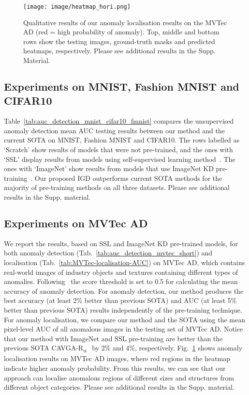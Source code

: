 \documentclass[letterpaper]{article} \usepackage{aaai22}  \usepackage{times}  \usepackage{helvet}  \usepackage{courier}  \usepackage[hyphens]{url}  \usepackage{graphicx} \urlstyle{rm} \def\UrlFont{\rm}  \usepackage{natbib}  \usepackage{caption} \DeclareCaptionStyle{ruled}{labelfont=normalfont,labelsep=colon,strut=off} \frenchspacing  \setlength{\pdfpagewidth}{8.5in}  \setlength{\pdfpageheight}{11in}  \usepackage{algorithm}
\begin{document}
\begin{figure}[t]
    \centering
    \texttt{[image: image/heatmap\_hori.png]}
    \caption{Qualitative results of our anomaly localisation results on the MVTec AD (red = high probability of anomaly). Top, middle and bottom rows show the testing images, ground-truth masks and predicted heatmaps, respectively. Please see additional results in the Supp. Material.} 
    \label{fig:mvtec_seg}
\end{figure}

\subsection{Experiments on MNIST, Fashion MNIST and CIFAR10}
Table~\ref{tab:auc_detection_mnist_cifar10_fmnist} compares the unsupervised anomaly detection mean AUC testing results between our method and the current SOTA on MNIST, Fashion MNIST and CIFAR10.
The rows labelled as `Scratch' show results of models that were not pre-trained, and the ones with `SSL' display results from models using self-supervised learning method~\cite{golan2018deep,bergman2020classification}. The ones with `ImageNet' show results from models that use ImageNet KD pre-training~\cite{venkataramanan2019attention,bergmann2020uninformed}. 
Our proposed IGD 
outperforms current SOTA methods for the majority of pre-training methods on all three datasets.
Please see additional results in the Supp. material.









\subsection{Experiments on MVTec AD}

We report the results, based on SSL and ImageNet KD pre-trained models, for both anomaly detection (Tab.~\ref{tab:auc_detection_mvtec_short}) and localisation (Tab.~\ref{tab:MVTec-localisation-AUC}) on MVTec AD, which contains real-world images of industry objects and textures containing different types of anomalies. Following~\cite{venkataramanan2019attention} the score threshold is set to 0.5 for calculating the mean accuracy of anomaly detection.
For anomaly detection, our method produces the best accuracy (at least 2\% better than previous SOTA) and AUC (at least 5\% better than previous SOTA) results independently of the pre-training technique.
For anomaly localisation, we compare our method and the SOTA using the mean pixel-level AUC of all anomalous images in the testing set of MVTec AD. Notice that our method with ImageNet and SSL pre-training are better than the previous SOTA CAVGA-R\textsubscript{u}~\cite{venkataramanan2019attention} by 2\% and 4\%, respectively.
Fig.~\ref{fig:mvtec_seg} shows anomaly localisation results on MVTec AD images, where red regions in the heatmap indicate higher anomaly probability. From this results, we can see that our approach can localise anomalous regions of different sizes and structures from different object categories.
Please see additional results in the Supp. material.
\end{document}
